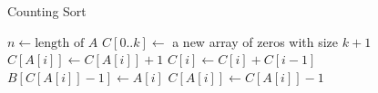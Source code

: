 \documentclass{article}
\begin{document}
\begin{algorithm}
\caption{Counting Sort}
\begin{algorithmic}[1]
 
    \State $n \gets \text{length of } A$
    \State $C[0..k] \gets$ a new array of zeros with size $k+1$
        \State $C[A[i]] \gets C[A[i]] + 1$
    \EndFor
        \State $C[i] \gets C[i] + C[i-1]$
    \EndFor
        \State $B[C[A[i]]-1] \gets A[i]$
        \State $C[A[i]] \gets C[A[i]] - 1$
    \EndFor
\EndProcedure
\end{algorithmic}
\end{algorithm}
\end{document}
